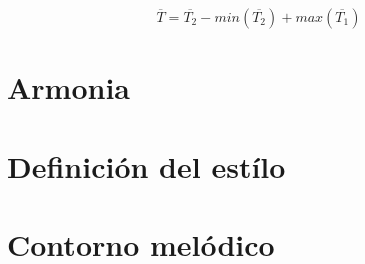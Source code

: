           \begin{equation}
              \overline{T} = \overline{T_{2}}  - min(\overline{T_{2}}) + max(\overline{T_{1}})
          \end{equation}

    \section {Armonia}
    \section {Definición del estílo}
    \section {Contorno melódico}
